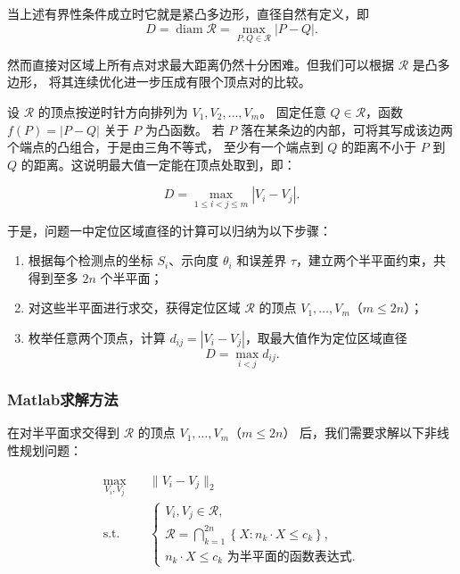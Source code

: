 \documentclass[withoutpreface,bwprint]{cumcmthesis} %
\begin{document}
当上述有界性条件成立时它就是紧凸多边形，直径自然有定义，即
\begin{equation}
D=\operatorname{diam}\mathcal R = \max_{P,Q\in\mathcal R}|P-Q|.
\end{equation}

然而直接对区域上所有点对求最大距离仍然十分困难。但我们可以根据 $\mathcal R$ 是凸多边形，
将其连续优化进一步压成有限个顶点对的比较。

设 $\mathcal R$ 的顶点按逆时针方向排列为 $V_1,V_2,\ldots,V_m$。
固定任意 $Q\in\mathcal R$，函数 $f(P)=|P-Q|$ 关于 $P$ 为凸函数。
若 $P$ 落在某条边的内部，可将其写成该边两个端点的凸组合，于是由三角不等式，
至少有一个端点到 $Q$ 的距离不小于 $P$ 到 $Q$ 的距离。这说明最大值一定能在顶点处取到，即：

\begin{equation}
D= \max_{1\leq i<j\leq m}|V_i-V_j|.
\end{equation}

于是，问题一中定位区域直径的计算可以归纳为以下步骤：
\begin{enumerate}
\item 根据每个检测点的坐标 $S_i$、示向度 $\theta_i$ 和误差界 $\tau$，建立两个半平面约束，共得到至多 $2n$ 个半平面；
\item 对这些半平面进行求交，获得定位区域 $\mathcal R$ 的顶点 $V_1,\ldots,V_m$（$m\leq2n$）；
\item 枚举任意两个顶点，计算 $d_{ij}=|V_i-V_j|$，取最大值作为定位区域直径
\begin{equation*}
D=\max_{i<j}d_{ij}.
\end{equation*}
\end{enumerate}

\subsubsection{Matlab求解方法}

在对半平面求交得到 $\mathcal R$ 的顶点 $V_1,\ldots,V_m$（$m\leq2n$） 后，我们需要求解以下非线性规划问题：

\begin{equation}
\begin{aligned}
\max_{V_i, V_j} \quad & \|V_i - V_j\|_2 \\
\text{s.t.} \quad & \begin{cases}
V_i, V_j \in \mathcal{R}, \\
\mathcal{R} = \bigcap_{k=1}^{2n} \left\{ X : n_k \cdot X \leq c_k \right\}, \\
n_k \cdot X \leq c_k \text{ 为半平面的函数表达式}.
\end{cases}
\end{aligned}
\end{equation}
\end{document}
